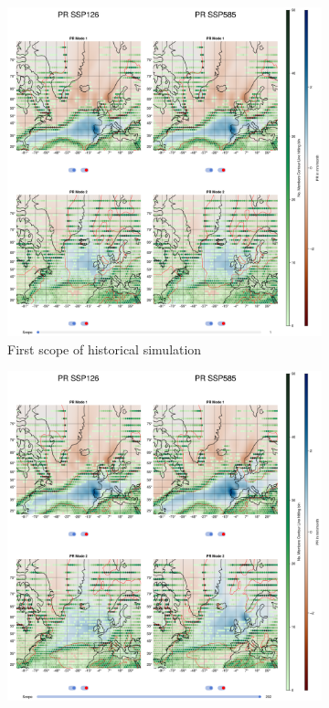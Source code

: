 \begin{figure}[!tbp]
  \begin{subfigure}[b]{0.49\textwidth}
        \includegraphics[width=\textwidth]{figures/pr_eof_2modes_historical.png}
    \caption{First scope of historical simulation}
    \label{fig:pr spatial patterns historical}
  \end{subfigure}
  \hfill
  \begin{subfigure}[b]{0.49\textwidth}
        \includegraphics[width=\textwidth]{figures/pr_eof_2modes_endscenario.png}

\end{subfigure}
\end{figure}
